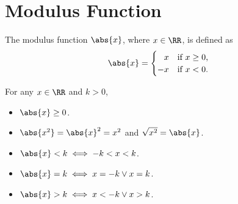 \section{Modulus Function}

\begin{definition}
    The modulus function $\abs{x}$, where $x \in \RR$, is defined as \[\abs{x} = \begin{cases}
        \phantom{-}x & \text{if $x \geq 0$,}\\
        -x & \text{if $x < 0$.}
    \end{cases}\]
\end{definition}

\begin{fact}
    For any $x \in \RR$ and $k > 0$,
    \begin{itemize}
        \item $\abs{x} \geq 0$.
        \item $\abs{x^2} = \abs{x}^2 = x^2$ and $\sqrt{x^2} = \abs{x}$.
        \item $\abs{x} < k \iff -k < x < k$.
        \item $\abs{x} = k \iff x = -k \lor x = k$.
        \item $\abs{x} > k \iff x < -k \lor x > k$.
    \end{itemize}
\end{fact}